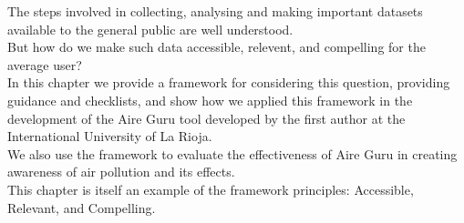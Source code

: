 The steps involved in collecting, analysing and making important datasets available to the general public are well understood. \\

But how do we make such data accessible, relevent, and compelling for the average user? \\

In this chapter we provide a framework for considering this question, providing guidance and checklists,
and show how we applied this framework in the development of the Aire Guru tool developed by the first
author at the International University of La Rioja. \\

We also use the framework to evaluate the effectiveness of Aire Guru in creating awareness of air pollution and its effects. \\

This chapter is itself an example of the framework principles: Accessible, Relevant, and Compelling. \\